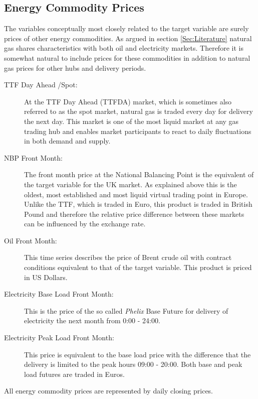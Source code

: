 \subsection{Energy Commodity Prices}
The variables conceptually most closely related to the target variable are surely prices of other energy commodities. As argued in  section \ref{Sec:Literature} natural gas shares characteristics with both oil and electricity markets. Therefore it is somewhat natural to include prices for these commodities in addition to natural gas prices for other hubs and delivery periods.
\begin{description}
\item[TTF Day Ahead /Spot:] At the TTF Day Ahead (TTFDA) market, which is sometimes also referred to as the spot market, natural gas is traded every day for delivery the next day. This market is one of the most liquid market at any gas trading hub and enables market participants to react to daily fluctuations in both demand and supply.
\item[NBP Front Month:] The front month price at the National Balancing Point is the equivalent of the target variable for the UK market. As explained above this is the oldest, most established and most liquid virtual trading point in Europe. Unlike the TTF, which is traded in Euro, this product is traded in British Pound and therefore the relative price difference between these markets can be influenced by the exchange rate.
\item[Oil Front Month:] This time series describes the price of  Brent crude oil with contract conditions equivalent to that of the target variable. This product is priced in US Dollars.
\item[Electricity Base Load Front Month:] This is the price of the so called \textit{Phelix} Base Future for delivery of electricity the next month from 0:00 - 24:00.
\item[Electricity Peak Load Front Month:] This price is equivalent to the base load price with the difference that the delivery is limited to the peak hours 09:00 - 20:00. Both base and peak load futures are traded in Euros.
\end{description}
All energy commodity prices are represented by daily closing prices.
